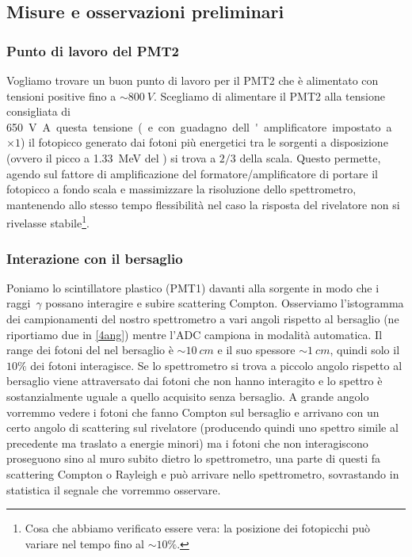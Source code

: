 \subsection{Misure e osservazioni preliminari}

\subsubsection{Punto di lavoro del PMT2}

Vogliamo trovare un buon punto di lavoro per il PMT2 che è alimentato con tensioni positive fino a $\sim \SI{800}{V}$. 
Scegliamo di alimentare il PMT2 alla tensione consigliata di \SI{650}V. A questa tensione (e con guadagno dell'amplificatore impostato a $\times 1$) il fotopicco generato dai fotoni più energetici tra le sorgenti a disposizione (ovvero il picco a \SI{1.33}{MeV} del \co) si trova a $2/3$ della scala. Questo permette, agendo sul fattore di amplificazione del formatore/amplificatore di portare il fotopicco a fondo scala  e massimizzare la risoluzione dello spettrometro, mantenendo allo stesso tempo flessibilità nel caso la risposta del rivelatore non si rivelasse stabile\footnote{Cosa che abbiamo verificato essere vera: la posizione dei fotopicchi può variare nel tempo fino al $\sim 10\%$.}.

\subsubsection{Interazione con il bersaglio}

Poniamo lo scintillatore plastico (PMT1) davanti alla sorgente in modo che i raggi~$\gamma$ possano interagire e subire scattering Compton. Osserviamo l'istogramma dei campionamenti del nostro spettrometro a vari angoli rispetto al bersaglio (ne riportiamo due in \autoref{4ang}) mentre l'ADC campiona in modalità automatica.
Il range dei fotoni del \co\; nel bersaglio è $\sim\SI{10}{cm}$ e il suo spessore $\sim\SI{1}{cm}$, quindi solo il $10\%$ dei fotoni interagisce. 
Se lo spettrometro si trova a piccolo angolo rispetto al bersaglio viene attraversato dai fotoni che non hanno interagito e lo spettro è sostanzialmente uguale a quello acquisito senza bersaglio. A grande angolo vorremmo vedere i fotoni che fanno Compton sul bersaglio e arrivano con un certo angolo di scattering sul rivelatore (producendo quindi uno spettro simile al precedente ma traslato a energie minori) ma i fotoni che non interagiscono proseguono sino al muro subito dietro lo spettrometro, una parte di questi fa scattering Compton o Rayleigh e può arrivare nello spettrometro, sovrastando in statistica il segnale che vorremmo osservare.

